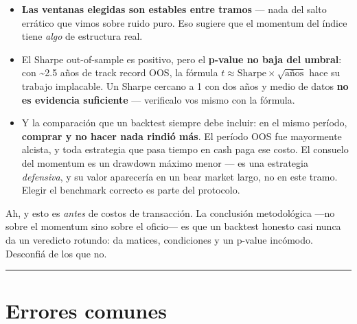 \documentclass[
  spanish,
  letterpaper,
  DIV=11,
  numbers=noendperiod]{scrreprt}
\providecommand{\tightlist}{%
  \setlength{\itemsep}{0pt}\setlength{\parskip}{0pt}}
\begin{document}
\begin{itemize}
\tightlist
\item
  \textbf{Las ventanas elegidas son estables entre tramos} --- nada del
  salto errático que vimos sobre ruido puro. Eso sugiere que el momentum
  del índice tiene \emph{algo} de estructura real.
\item
  El Sharpe out-of-sample es positivo, pero el \textbf{p-value no baja
  del umbral}: con \textasciitilde2.5 años de track record OOS, la
  fórmula \(t \approx \text{Sharpe} \times \sqrt{\text{años}}\) hace su
  trabajo implacable. Un Sharpe cercano a 1 con dos años y medio de
  datos \textbf{no es evidencia suficiente} --- verificalo vos mismo con
  la fórmula.
\item
  Y la comparación que un backtest siempre debe incluir: en el mismo
  período, \textbf{comprar y no hacer nada rindió más}. El período OOS
  fue mayormente alcista, y toda estrategia que pasa tiempo en cash paga
  ese costo. El consuelo del momentum es un drawdown máximo menor --- es
  una estrategia \emph{defensiva}, y su valor aparecería en un bear
  market largo, no en este tramo. Elegir el benchmark correcto es parte
  del protocolo.
\end{itemize}

Ah, y esto es \emph{antes} de costos de transacción. La conclusión
metodológica ---no sobre el momentum sino sobre el oficio--- es que un
backtest honesto casi nunca da un veredicto rotundo: da matices,
condiciones y un p-value incómodo. Desconfiá de los que no.

\begin{center}\rule{0.5\linewidth}{0.5pt}\end{center}

\chapter{Errores comunes}\label{errores-comunes-15}
\end{document}
